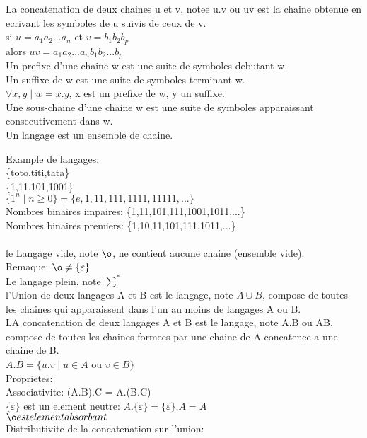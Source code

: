\documentclass{article}
\begin{document}
La concatenation de deux chaines u et v, notee u.v ou uv est la chaine obtenue en ecrivant les symboles de u suivis de ceux de v.\\
si $u=a_1 a_2 ... a_n$ et $v=b_1 b_2 b_p$\\
alors $uv=a_1 a_2 ... a_n b_1 b_2 ... b_p$\\

Un prefixe d'une chaine w est une suite de symboles debutant w.\\
Un suffixe de w est une suite de symboles terminant w.\\
$\forall x,y \mid w=x.y$, x est un prefixe de w, y un suffixe.\\

Une sous-chaine d'une chaine w est une suite de symboles apparaissant consecutivement dans w.\\

Un langage est un ensemble de chaine.

Example de langages:\\
\{toto,titi,tata\}\\
\{1,11,101,1001\}\\
$\{1^n \mid n \geq 0\} = \{e,1,11,111,1111,11111,...\}$\\
Nombres binaires impaires: \{1,11,101,111,1001,1011,...\}\\
Nombres binaires premiers: \{1,10,11,101,111,1011,...\}\\
\\
le Langage vide, note $\o$, ne contient aucune chaine (ensemble vide).\\

Remaque: $\o \ne \{\varepsilon\}$\\
Le langage plein, note $\sum^*$\\

l'Union de deux langages A et B est le langage, note $A \cup B$, compose de toutes les chaines qui apparaissent dans l'un au moins de langages A ou B.\\

LA concatenation de deux langages A et B est le langage, note A.B ou AB, compose de toutes les chaines formees par une chaine de A concatenee a une chaine de B.\\
$A.B = \{u.v \mid u \in A$ ou $ v \in B\}$\\

Proprietes:\\
Associativite: (A.B).C = A.(B.C) \\
$\{\varepsilon\}$ est un element neutre: $A.\{\varepsilon\} = \{\varepsilon\}.A = A$\\
$\o est element absorbant$\\
Distributivite de la concatenation sur l'union:\\
\end{document}
